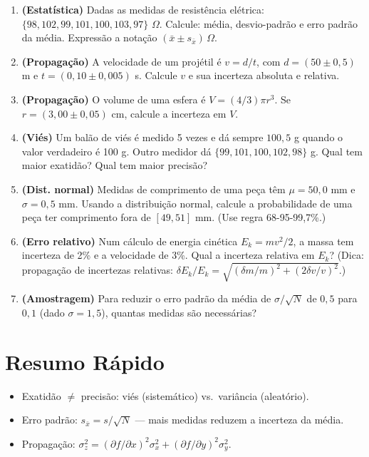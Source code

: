\documentclass[12pt,a4paper]{article}
\begin{document}
\begin{enumerate}
  \item \textbf{(Estat\'istica)} Dadas as medidas de resist\^encia el\'etrica: $\{98, 102, 99, 101, 100, 103, 97\}$ $\Omega$. Calcule: m\'edia, desvio-padr\~ao e erro padr\~ao da m\'edia. Express\~ao a nota\c{c}\~ao $(\bar x \pm s_{\bar x})\,\Omega$.
  
  \item \textbf{(Propaga\c{c}\~ao)} A velocidade de um projétil \'e $v = d/t$, com $d = (50 \pm 0{,}5)$ m e $t = (0{,}10 \pm 0{,}005)$ s. Calcule $v$ e sua incerteza absoluta e relativa.
  
  \item \textbf{(Propaga\c{c}\~ao)} O volume de uma esfera \'e $V = (4/3)\pi r^3$. Se $r = (3{,}00 \pm 0{,}05)$ cm, calcule a incerteza em $V$.
  
  \item \textbf{(Vi\'es)} Um bal\~ao de vi\'es \'e medido 5 vezes e d\'a sempre $100{,}5$ g quando o valor verdadeiro \'e 100 g. Outro medidor d\'a $\{99, 101, 100, 102, 98\}$ g. Qual tem maior exatid\~ao? Qual tem maior precis\~ao?
  
  \item \textbf{(Dist. normal)} Medidas de comprimento de uma pe\c{c}a t\^em $\mu = 50{,}0$ mm e $\sigma = 0{,}5$ mm. Usando a distribui\c{c}\~ao normal, calcule a probabilidade de uma pe\c{c}a ter comprimento fora de $[49, 51]$ mm. (Use regra 68-95-99,7\%.)
  
  \item \textbf{(Erro relativo)} Num c\'alculo de energia cin\'etica $E_k = mv^2/2$, a massa tem incerteza de 2\% e a velocidade de 3\%. Qual a incerteza relativa em $E_k$? (Dica: propaga\c{c}\~ao de incertezas relativas: $\delta E_k/E_k = \sqrt{(\delta m/m)^2 + (2\delta v/v)^2}$.)
  
  \item \textbf{(Amostragem)} Para reduzir o erro padr\~ao da m\'edia de $\sigma/\sqrt{N}$ de $0{,}5$ para $0{,}1$ (dado $\sigma = 1{,}5$), quantas medidas s\~ao necess\'arias?
\end{enumerate}

\section*{Resumo R\'apido}
\begin{itemize}
  \item Exatid\~ao $\neq$ precis\~ao: vi\'es (sistem\'atico) vs.\ vari\^ancia (aleat\'orio).
  \item Erro padr\~ao: $s_{\bar x} = s/\sqrt{N}$ --- mais medidas reduzem a incerteza da m\'edia.
  \item Propaga\c{c}\~ao: $\sigma_z^2 = (\partial f/\partial x)^2\sigma_x^2 + (\partial f/\partial y)^2\sigma_y^2$.
\end{itemize}
\end{document}
